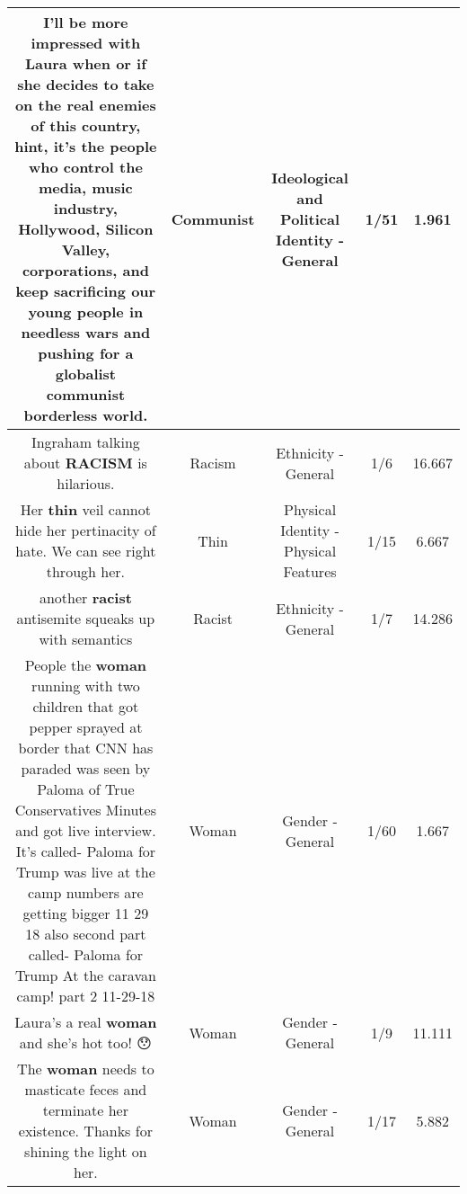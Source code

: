 \documentclass[11pt]{article}
\newlength\mylength
\begin{document}
\begin{center}
\begin{longtable}{|C{.65\mylength}|C{.30\mylength}|C{.12\mylength}|C{.12\mylength}|C{.12\mylength}|}
  \small I'll be more impressed with Laura when or if she decides to take on the real enemies of this country, hint, it's the people who control the media, music industry, Hollywood, Silicon Valley, corporations, and keep sacrificing our young people in needless wars and pushing for a globalist \textbf{communist} borderless world.\normalsize   & Communist &  Ideological and Political Identity - General & 1/51 & 1.961 \\  \hline
  \small Ingraham talking about \textbf{RACISM} is hilarious.\normalsize   & Racism & Ethnicity - General & 1/6 & 16.667 \\  \hline
  \small Her \textbf{thin} veil cannot hide her pertinacity of hate. We can see right through her.\normalsize   & Thin & Physical Identity - Physical Features & 1/15 & 6.667 \\  \hline
  \small another \textbf{racist} antisemite squeaks up with semantics\normalsize   & Racist & Ethnicity - General & 1/7 & 14.286 \\  \hline
  \small People the \textbf{woman} running with two children that got pepper sprayed at border that CNN has paraded was seen by Paloma of True Conservatives Minutes and got live interview. It's called- Paloma for Trump was live at the camp numbers are getting bigger 11 29 18 also second part called- Paloma for Trump At the caravan camp! part 2  11-29-18\normalsize   & Woman & Gender - General & 1/60 & 1.667 \\  \hline
  \small Laura's a real \textbf{woman} and she's hot too! 😯\normalsize   & Woman & Gender - General & 1/9 & 11.111 \\  \hline
  \small The \textbf{woman} needs to masticate feces and terminate her existence.  Thanks for shining the light on her.\normalsize   & Woman & Gender - General & 1/17 & 5.882 \\  \hline

\end{longtable}
\end{center}
\end{document}
